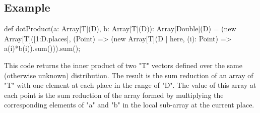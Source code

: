 \subsection{Example}
\begin{xten}
def dotProduct(a: Array[T](D), b: Array[T](D)): Array[Double](D) =
  (new Array[T]([1:D.places],
      (Point) => (new Array[T](D | here,
                    (i): Point) => a(i)*b(i)).sum())).sum();
\end{xten}

This code returns the inner product of two \xcd"T" vectors defined
over the same (otherwise unknown) distribution. The result is the sum
reduction of an array of \xcd"T" with one element at each place in the
range of \xcd"D". The value of this array at each point is the sum
reduction of the array formed by multiplying the corresponding
elements of \xcd"a" and \xcd"b" in the local sub-array at the current
place.



